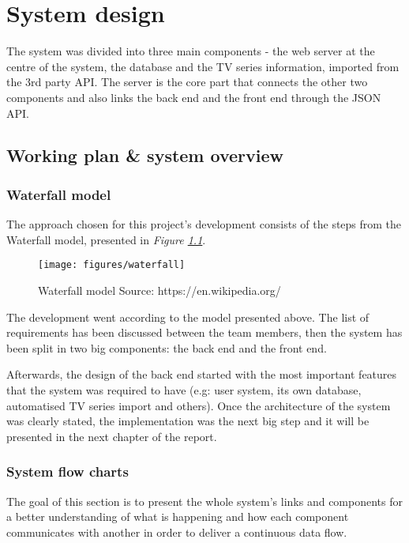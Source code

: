 \chapter{System design}

The system was divided into three main components - the web server at the centre of the system, the database and the TV series information, imported from the 3rd party API. The server is the core part that connects the other two components and also links the back end and the front end through the JSON API.

\section{Working plan \& system overview}

\subsection{Waterfall model}

The approach chosen for this project's development consists of the steps from the Waterfall model, presented in \textit{Figure \ref{fig:waterfall}}.

\begin{figure}[h]
\caption{Waterfall model \newline Source: https://en.wikipedia.org/}
\centering
\texttt{[image: figures/waterfall]}
\label{fig:waterfall}
\end{figure}

The development went according to the model presented above. The list of requirements has been discussed between the team members, then the system has been split in two big components: the back end and the front end.

Afterwards, the design of the back end started with the most important features that the system was required to have (e.g: user system, its own database, automatised TV series import and others). Once the architecture of the system was clearly stated, the implementation was the next big step and it will be presented in the next chapter of the report.

\subsection{System flow charts}

The goal of this section is to present the whole system's links and components for a better understanding of what is happening and how each component communicates with another in order to deliver a continuous data flow.

